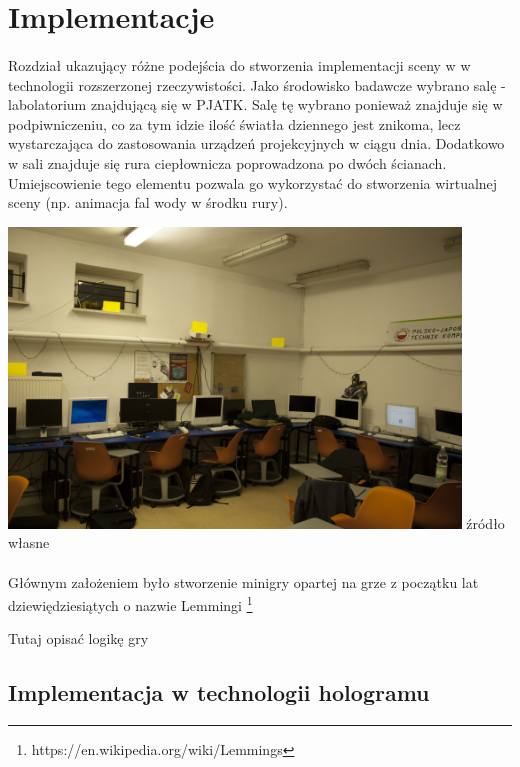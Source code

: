 \section{Implementacje}
\paragraph{}
Rozdział ukazujący różne podejścia do stworzenia implementacji sceny w w technologii rozszerzonej rzeczywistości.
Jako środowisko badawcze wybrano salę - labolatorium znajdującą się w PJATK. Salę tę wybrano ponieważ znajduje się w podpiwniczeniu, co za tym idzie ilość światła dziennego jest znikoma, lecz wystarczająca do zastosowania urządzeń projekcyjnych w ciągu dnia. Dodatkowo w sali znajduje się rura ciepłownicza poprowadzona po dwóch ścianach. Umiejscowienie tego elementu pozwala go wykorzystać do stworzenia wirtualnej sceny (np. animacja fal wody w środku rury).

\begin{center}
\includegraphics[width=0.9\textwidth]{images/s9.jpg}
\small {źródło własne }
\end{center}

\paragraph{}
Głównym założeniem było stworzenie minigry opartej na grze z początku lat dziewiędziesiątych o nazwie Lemmingi \footnote{https://en.wikipedia.org/wiki/Lemmings}

{\color{red}Tutaj opisać logikę gry}

\subsection{Implementacja w technologii hologramu}
